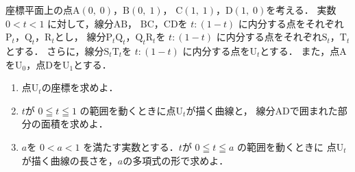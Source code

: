 ﻿\documentclass[../../../uem_mat_tok_q.tex]{subfiles}
\begin{document}
    座標平面上の点$\mathrm{A}(0,\;0)$，$\mathrm{B}(0,\;1)$，%
    $\mathrm{C}(1,\;1)$，$\mathrm{D}(1,\;0)$を考える．%
    実数 $0<t<1$ に対して，線分$\mathrm{A}\mathrm{B}$，%
    $\mathrm{B}\mathrm{C}$，$\mathrm{C}\mathrm{D}$を $t:(1-t)$ に内分する点をそれぞれ%
    $\mathrm{P}_t$，$\mathrm{Q}_t$，$\mathrm{R}_t$とし，%
    線分$\mathrm{P}_t\mathrm{Q}_t$，$\mathrm{Q}_t\mathrm{R}_t$を %
    $t:(1-t)$ に内分する点をそれぞれ$\mathrm{S}_t$，$\mathrm{T}_t$とする．%
    さらに，線分$\mathrm{S}_t\mathrm{T}_t$を $t:(1-t)$ に内分する点を$\mathrm{U}_t$とする．%
    また，点Aを$\mathrm{U}_0$，点Dを$\mathrm{U}_1$とする．

    \begin{enumerate}
        \item 点$\mathrm{U}_t$の座標を求めよ．
        \item $t$が $0\leqq t\leqq1$ の範囲を動くときに点$\mathrm{U}_t$が描く曲線と，%
            線分ADで囲まれた部分の面積を求めよ．
        \item $a$を $0<a<1$ を満たす実数とする．$t$が $0\leqq t\leqq a$ の範囲を動くときに%
            点$\mathrm{U}_t$が描く曲線の長さを，$a$の多項式の形で求めよ．
    \end{enumerate}
\end{document}
